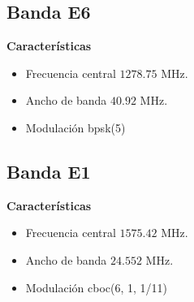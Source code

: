 \subsection{Banda E6}

\begin{justify}
    \textbf{Características}
    \begin{itemize}
        \item Frecuencia central $1278.75$ MHz.
        \item Ancho de banda $40.92$ MHz.
        \item Modulación \gls{bpsk}(5)
    \end{itemize}
\end{justify}

\subsection{Banda E1}

\begin{justify}
    \textbf{Características}
    \begin{itemize}
        \item Frecuencia central $1575.42$ MHz.
        \item Ancho de banda $24.552$ MHz.
        \item Modulación \gls{cboc}(6, 1, 1/11)
    \end{itemize}
\end{justify}